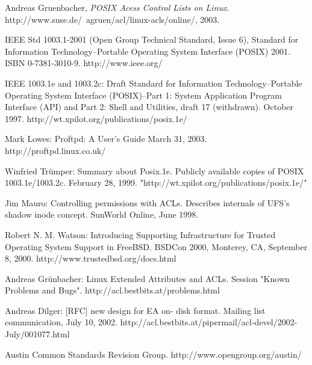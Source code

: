 \documentclass{article}
\begin{document}
\newpage

\begin{thebibliography}{9}
 
  Andreas Gruenbacher,
  \emph{POSIX Acess Control Lists on Linux}.
  http://www.suse.de/~agruen/acl/linux-acls/online/,
  2003.

    IEEE Std 1003.1-2001 (Open Group Technical Standard, Issue 6), 
	Standard for Information Technology--Portable Operating System Interface (POSIX) 2001. 
	ISBN 0-7381-3010-9. 
	http://www.ieee.org/

    IEEE 1003.1e and 1003.2c: Draft Standard for Information Technology--Portable Operating System Interface (POSIX)--Part 1: System Application Program Interface (API) and Part 2: Shell and Utilities, draft 17 (withdrawn). 
	October 1997. 
	http://wt.xpilot.org/publications/posix.1e/

	Mark Lowes: 
	Proftpd: 
	A User's Guide March 31, 2003. 
	http://proftpd.linux.co.uk/

    Winfried Trümper: Summary about Posix.1e. Publicly available copies of POSIX 1003.1e/1003.2c. February 28, 1999. "http://wt.xpilot.org/publications/posix.1e/"

	Jim Mauro: Controlling permissions with ACLs. Describes internals of UFS's shadow inode concept. SunWorld Online, June 1998.

	Robert N. M. Watson: Introducing Supporting Infrastructure for Trusted Operating System Support in FreeBSD. BSDCon 2000, Monterey, CA, September 8, 2000. http://www.trustedbsd.org/docs.html
	
	Andreas Grünbacher: Linux Extended Attributes and ACLs. Session "Known Problems and Bugs". http://acl.bestbits.at/problems.html
	
	Andreas Dilger: [RFC] new design for EA on- disk format. Mailing list communication, July 10, 2002. http://acl.bestbits.at/pipermail/acl-devel/2002-July/001077.html
	
	Austin Common Standards Revision Group. http://www.opengroup.org/austin/

\end{thebibliography}
\end{document}
